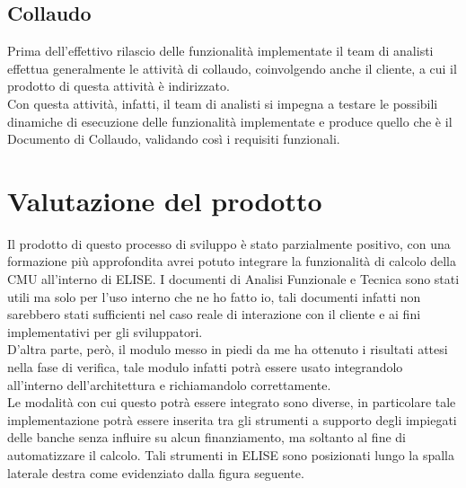\subsection{Collaudo}

	Prima dell'effettivo rilascio delle funzionalità implementate il team di analisti effettua generalmente le attività di collaudo, coinvolgendo anche il cliente, a cui il prodotto di questa attività è indirizzato.\\
	
	Con questa attività, infatti, il team di analisti si impegna a testare le possibili dinamiche di esecuzione delle funzionalità implementate e produce quello che è il Documento di Collaudo, validando così i requisiti funzionali.

\section{Valutazione del prodotto}

	Il prodotto di questo processo di sviluppo è stato parzialmente positivo, con una formazione più approfondita avrei potuto integrare la funzionalità di calcolo della CMU all'interno di ELISE. I documenti di Analisi Funzionale e Tecnica sono stati utili ma solo per l'uso interno che ne ho fatto io, tali documenti infatti non sarebbero stati sufficienti nel caso reale di interazione con il cliente e ai fini implementativi per gli sviluppatori.\\
	
	D'altra parte, però, il modulo messo in piedi da me ha ottenuto i risultati attesi nella fase di verifica, tale modulo infatti potrà essere usato integrandolo all'interno dell'architettura e richiamandolo correttamente.\\
	
	Le modalità con cui questo potrà essere integrato sono diverse, in particolare tale implementazione potrà essere inserita tra gli strumenti a supporto degli impiegati delle banche senza influire su alcun finanziamento, ma soltanto al fine di automatizzare il calcolo. Tali strumenti in ELISE sono posizionati lungo la spalla laterale destra come evidenziato dalla figura seguente.
	
